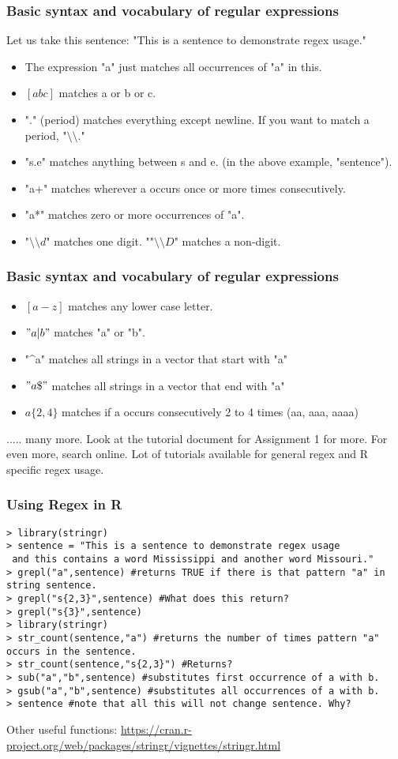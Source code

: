 \documentclass{beamer}
\begin{document}
\begin{frame}
\frametitle{Basic syntax and vocabulary of regular expressions}
Let us take this sentence: "This is a sentence to demonstrate regex usage."
\begin{itemize}
\item The expression "a" just matches all occurrences of "a" in this. \pause
\item $[abc]$ matches a or b or c. \pause
\item "." (period) matches everything except newline. If you want to match a period, "$\setminus\setminus.$" \pause
\item "s.e" matches anything between s and e. (in the above example, "sentence"). \pause
\item "a+" matches wherever a occurs once or more times consecutively.
\item "a*" matches zero or more occurrences of "a". \pause
\item "$\setminus\setminus d$" matches one digit. ""$\setminus\setminus D$" matches a non-digit. 
\end{itemize}
\end{frame}

\begin{frame}
\frametitle{Basic syntax and vocabulary of regular expressions}
\begin{itemize}
\item $[a-z]$ matches any lower case letter. 
\item $"a|b"$ matches "a" or "b".
\item "\^{}a" matches all strings in a vector that start with "a"
\item $"a\$"$ matches all strings in a vector that end with "a"
\item $a\{2,4\}$ matches if a occurs consecutively 2 to 4 times (aa, aaa, aaaa)
\end{itemize} \pause
..... many more. Look at the tutorial document for Assignment 1 for more.  For even more, search online. Lot of tutorials available for general regex and R specific regex usage. 
\end{frame}

\begin{frame}[fragile]
\frametitle{Using Regex in R}
\tiny
\begin{verbatim}
> library(stringr)
> sentence = "This is a sentence to demonstrate regex usage
 and this contains a word Mississippi and another word Missouri."
> grepl("a",sentence) #returns TRUE if there is that pattern "a" in string sentence.
> grepl("s{2,3}",sentence) #What does this return?
> grepl("s{3}",sentence)
> library(stringr)
> str_count(sentence,"a") #returns the number of times pattern "a" occurs in the sentence.
> str_count(sentence,"s{2,3}") #Returns?
> sub("a","b",sentence) #substitutes first occurrence of a with b.
> gsub("a","b",sentence) #substitutes all occurrences of a with b.
> sentence #note that all this will not change sentence. Why?
\end{verbatim}
Other useful functions: \url{https://cran.r-project.org/web/packages/stringr/vignettes/stringr.html}
\end{frame}
\end{document}
